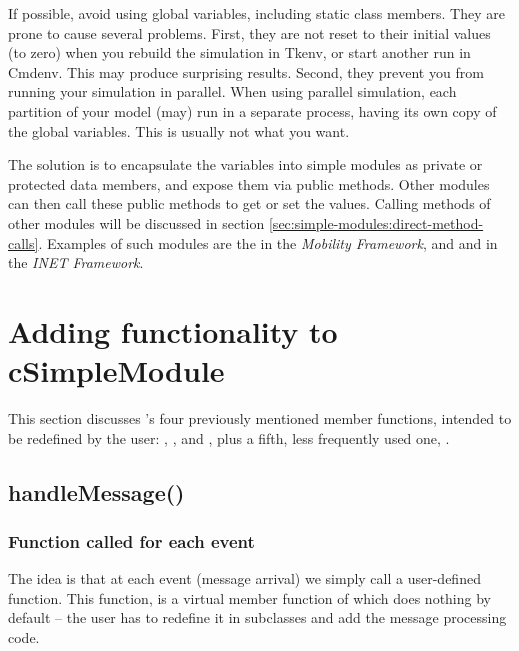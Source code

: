 If possible, avoid using global variables, including
static class members. They are prone to cause several problems.
First, they are not reset to their initial values (to zero)
when you rebuild the simulation in Tkenv, or start another run
in Cmdenv. This may produce surprising results.
Second, they prevent you from running your simulation in parallel.
When using parallel simulation, each partition of your model
(may) run in a separate process, having its own copy of the
global variables. This is usually not what you want.

The solution is to encapsulate the variables into simple modules
as private or protected data members, and expose them via public methods.
Other modules can then call these public methods to get or set the values.
Calling methods of other modules will be discussed in section
\ref{sec:simple-modules:direct-method-calls}.
Examples of such modules are the  in the \textit{Mobility Framework},
and  and  in the \textit{INET Framework}.



\section{Adding functionality to cSimpleModule}
\label{sec:simple-modules:adding-functionality-to-csimplemodule}

This section discusses 's four previously
mentioned member functions, intended to be redefined by the user:
, , 
and , plus a fifth, less frequently used one,
.



\subsection{handleMessage()}
\label{sec:simple-modules:handlemessage}

\subsubsection{Function called for each event}


The idea is that at each event (message arrival) we
simply call a user-defined function. This function,
 is a
virtual member function of  which does
nothing by default -- the user has to redefine it in subclasses
and add the message processing code.

